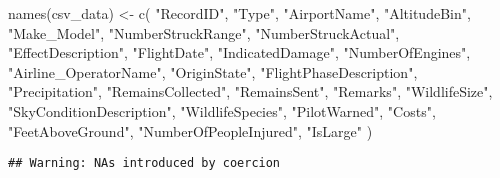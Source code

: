 \documentclass[
]{article}
\newenvironment{Shaded}{\begin{snugshade}}{\end{snugshade}}
\newcommand{\CommentTok}[1]{\textcolor[rgb]{0.56,0.35,0.01}{\textit{#1}}}
\newcommand{\FunctionTok}[1]{\textcolor[rgb]{0.00,0.00,0.00}{#1}}
\newcommand{\NormalTok}[1]{#1}
\newcommand{\OtherTok}[1]{\textcolor[rgb]{0.56,0.35,0.01}{#1}}
\newcommand{\SpecialCharTok}[1]{\textcolor[rgb]{0.00,0.00,0.00}{#1}}
\newcommand{\StringTok}[1]{\textcolor[rgb]{0.31,0.60,0.02}{#1}}
\begin{document}
\begin{Shaded}
\begin{Highlighting}[]
\FunctionTok{names}\NormalTok{(csv\_data) }\OtherTok{\textless{}{-}} \FunctionTok{c}\NormalTok{(}
  \StringTok{"RecordID"}\NormalTok{, }
  \StringTok{"Type"}\NormalTok{, }
  \StringTok{"AirportName"}\NormalTok{, }
  \StringTok{"AltitudeBin"}\NormalTok{, }
  \StringTok{"Make\_Model"}\NormalTok{, }
  \StringTok{"NumberStruckRange"}\NormalTok{, }
  \StringTok{"NumberStruckActual"}\NormalTok{, }
  \StringTok{"EffectDescription"}\NormalTok{, }
  \StringTok{"FlightDate"}\NormalTok{, }
  \StringTok{"IndicatedDamage"}\NormalTok{, }
  \StringTok{"NumberOfEngines"}\NormalTok{, }
  \StringTok{"Airline\_OperatorName"}\NormalTok{, }
  \StringTok{"OriginState"}\NormalTok{, }
  \StringTok{"FlightPhaseDescription"}\NormalTok{, }
  \StringTok{"Precipitation"}\NormalTok{, }
  \StringTok{"RemainsCollected"}\NormalTok{, }
  \StringTok{"RemainsSent"}\NormalTok{,}
  \StringTok{"Remarks"}\NormalTok{,}
  \StringTok{"WildlifeSize"}\NormalTok{,}
  \StringTok{"SkyConditionDescription"}\NormalTok{,}
  \StringTok{"WildlifeSpecies"}\NormalTok{,}
  \StringTok{"PilotWarned"}\NormalTok{,}
  \StringTok{"Costs"}\NormalTok{,}
  \StringTok{"FeetAboveGround"}\NormalTok{,}
  \StringTok{"NumberOfPeopleInjured"}\NormalTok{,}
  \StringTok{"IsLarge"}
\NormalTok{)}
\end{Highlighting}
\end{Shaded}

\begin{Shaded}
\end{Shaded}

\begin{verbatim}
## Warning: NAs introduced by coercion
\end{verbatim}
\end{document}
